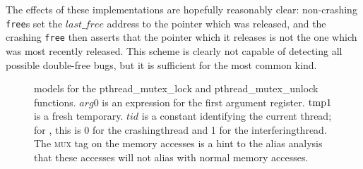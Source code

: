 The effects of these implementations are hopefully reasonably clear:
non-crashing \texttt{free}s set the $\mathit{last\_free}$ address to
the pointer which was released, and the crashing \texttt{free} then
asserts that the pointer which it releases is not the one which was
most recently released.  This scheme is clearly not capable of
detecting all possible double-free bugs, but it is sufficient for the
most common kind.

\begin{figure}
  \centerline{
    {\hfill}
    {\hfill}
  }
  \caption{{\StateMachine} models for the pthread\_mutex\_lock and
    pthread\_mutex\_unlock functions.  $\mathit{arg0}$ is an
    expression for the first argument register.  $\mathrm{tmp1}$ is a
    fresh {\StateMachine} temporary.  $\mathit{tid}$ is a constant
    identifying the current thread; for {\implementation}, this is 0
    for the \gls{crashingthread} and 1 for the
    \gls{interferingthread}.  The \textsc{mux} tag on the memory
    accesses is a hint to the alias analysis that these accesses will
    not alias with normal memory accesses.}
  \label{fig:library_mux}
\end{figure}

